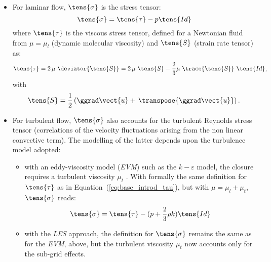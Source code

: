 \begin{itemize}
 \item For laminar flow, $\tens{\sigma}$ is the stress tensor:
\begin{equation}
\tens{\sigma}=\tens{\tau}-p\tens{Id}
\end{equation}%
where $\tens{\tau}$ is the viscous stress tensor,
 defined for a Newtonian fluid from $\mu =\mu_l $ (dynamic molecular viscosity) 
and $\tens{S}$ (strain rate tensor) as:
\begin{equation}\label{eq:base_introd_tau}%
\tens{\tau}=2\,\mu \ \deviator{\tens{S}} = 2\,\mu \ \tens{S}-\frac{2}{3}\mu \ \trace{\tens{S}}\ \tens{Id},
\end{equation}
%
%
with
\begin{equation}\label{eq:base_introd_strainrate}%
 \tens{S}=\frac{1}{2} \left( \ggrad\vect{u}+\,
\transpose{\ggrad\vect{u}} \right).
\end{equation}


\item For turbulent flow, $\displaystyle \tens{\sigma}$ also accounts
for the turbulent Reynolds stress tensor (correlations of the velocity
fluctuations arising from the non linear convective term). The modelling of
the latter depends upon the turbulence model adopted:

\begin{itemize}
\item with an eddy-viscosity model (\emph{EVM}) such as the $%
k-\varepsilon $ model, the closure requires a turbulent viscosity $\mu _{t}$%
. With formally the same definition for $\tens{\tau}$ as in Equation~(\ref{eq:base_introd_tau}),
 but with $\mu =\mu _{l}+\mu _{t}$, $\tens{\sigma}$ reads:
\begin{equation}
\tens{\sigma}=\tens{\tau}-(p+\frac{2}{3}\rho k)\tens{Id}
\end{equation}

\item with the \emph{LES} approach, the definition for $\tens{\sigma}$
remains the same as for the \emph{EVM}, above, but the turbulent viscosity $\mu
_{t} $ now accounts only for the sub-grid effects.


\end{itemize}
\end{itemize}
